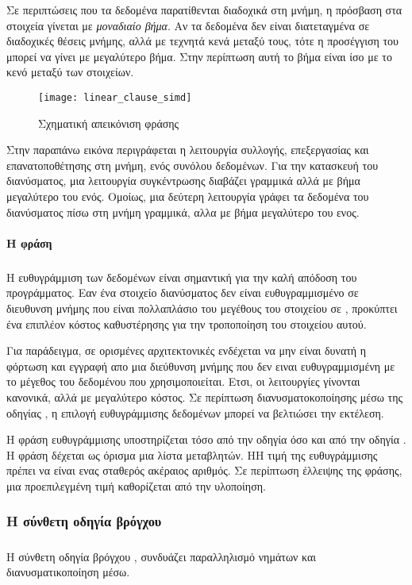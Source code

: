 Σε περιπτώσεις που τα δεδομένα παρατίθενται διαδοχικά στη μνήμη, η πρόσβαση στα στοιχεία γίνεται με \emph{μοναδιαίο βήμα}. Αν τα δεδομένα δεν είναι διατεταγμένα σε διαδοχικές θέσεις μνήμης, αλλά με τεχνητά κενά μεταξύ τους, τότε η προσέγγιση του μπορεί να γίνει με μεγαλύτερο βήμα. Στην περίπτωση αυτή το βήμα είναι ίσο με το κενό μεταξύ των στοιχείων.

\begin{figure}[h]
\texttt{[image: linear\_clause\_simd]}
\centering
\captionsetup{justification=centering, singlelinecheck=false}
	\caption{Σχηματική απεικόνιση φράσης \emph{}}
\label{fig:linear_clause_simd}
\end{figure}

Στην παραπάνω εικόνα περιγράφεται η λειτουργία συλλογής, επεξεργασίας και επανατοποθέτησης στη μνήμη, ενός συνόλου δεδομένων. Για την κατασκευή του διανύσματος, μια λειτουργία συγκέντρωσης διαβάζει γραμμικά αλλά με βήμα μεγαλύτερο του ενός. Ομοίως, μια δεύτερη λειτουργία γράφει τα δεδομένα του διανύσματος πίσω στη μνήμη γραμμικά, αλλα με βήμα μεγαλύτερο του ενος.


\paragraph{H φράση \emph{}}
\subparagraph{}
Η ευθυγράμμιση των δεδομένων είναι σημαντική για την καλή απόδοση του προγράμματος. Εαν ένα στοιχείο διανύσματος δεν είναι ευθυγραμμισμένο σε διευθυνση μνήμης που είναι πολλαπλάσιο του μεγέθους του στοιχείου σε \emph{}, προκύπτει ένα επιπλέον κόστος καθυστέρησης για την τροποποίηση του στοιχείου αυτού.

Για παράδειγμα, σε ορισμένες αρχιτεκτονικές ενδέχεται να μην είναι δυνατή η φόρτωση και εγγραφή απο μια διεύθυνση μνήμης που δεν ειναι ευθυγραμμισμένη με το μέγεθος του δεδομένου που χρησιμοποιείται. Ετσι, οι λειτουργίες γίνονται κανονικά, αλλά με μεγαλύτερο κόστος. Σε περίπτωση διανυσματοκοποίησης μέσω της οδηγίας \emph{}, η επιλογή ευθυγράμμισης δεδομένων μπορεί να βελτιώσει την εκτέλεση.

Η φράση ευθυγράμμισης υποστηρίζεται τόσο από την οδηγία \emph{} όσο και από την οδηγία \emph{}. Η φράση δέχεται ως όρισμα μια λίστα μεταβλητών. ΗΗ τιμή της ευθυγράμμισης πρέπει να είναι ενας σταθερός ακέραιος αριθμός. Σε περίπτωση έλλειψης της φράσης, μια προεπιλεγμένη τιμή καθορίζεται από την υλοποίηση.

\clearpage
\subsubsection{Η σύνθετη οδηγία βρόγχου \emph{}}
\subparagraph{}
Η σύνθετη οδηγία βρόγχου \emph{}, συνδυάζει παραλληλισμό νημάτων και διανυσματικοποίηση μέσω\emph{}.

